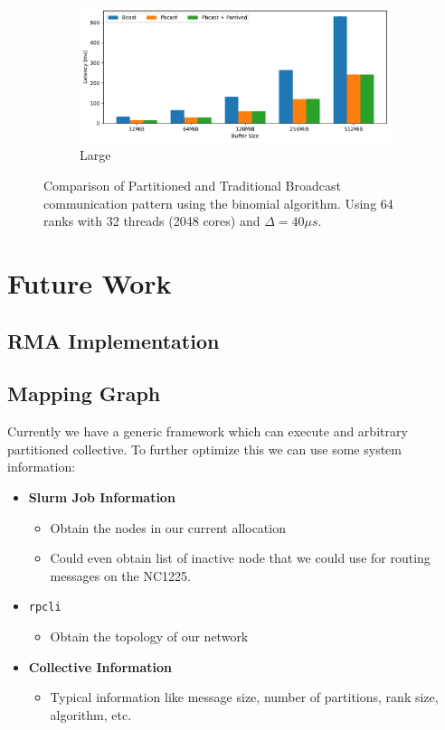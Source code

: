 \documentclass{article}
\begin{document}
\begin{figure}[h]
    \begin{subfigure}[b]{0.44\textwidth}
      \centering
      \includegraphics[width=\textwidth]{data-knomial-2-bcast/large_64.pdf}
      \caption{Large}
    \end{subfigure}
    \caption{Comparison of Partitioned and Traditional Broadcast communication
             pattern using the binomial algorithm. Using 64 ranks with 32 threads
             (2048 cores) and $\Delta = 40\mu s$.}
  \end{figure}

  \section{Future Work}
  \subsection{RMA Implementation}

  \subsection{Mapping Graph}
  Currently we have a generic framework which can execute and arbitrary
  partitioned collective.
  To further optimize this we can use some system information:
  \begin{itemize}
    \item \textbf{Slurm Job Information}
    \begin{itemize}
      \item Obtain the nodes in our current allocation
      \item Could even obtain list of inactive node that we could use for
            routing messages on the NC1225.
    \end{itemize}
    \item \texttt{rpcli}
    \begin{itemize}
      \item Obtain the topology of our network
    \end{itemize}
    \item \textbf{Collective Information}
    \begin{itemize}
      \item Typical information like message size, number of partitions, rank
            size, algorithm, etc.
    \end{itemize}
  \end{itemize}
\end{document}
